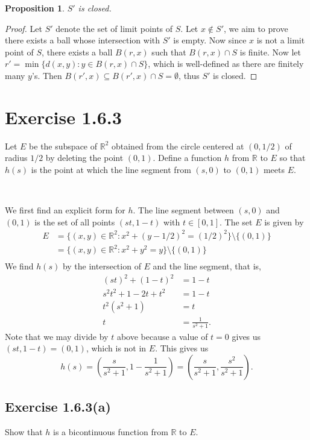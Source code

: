 \documentclass[12pt]{article}
\newcommand{\R}{\mathbb{R}}
\newenvironment{problem}
    {\begin{lrbox}{\mybox}\begin{minipage}{\textwidth-10pt}}
    {\end{minipage}\end{lrbox}\framebox[6.5in]{\usebox{\mybox}}\\}
\newtheorem{proposition}{Proposition}
\begin{document}
\newpage
\begin{proposition}
    $S'$ is closed.
\end{proposition}

\begin{proof}
     Let $S'$ denote the set of limit points of $S$. Let $x\notin S'$, we aim to prove there exists a ball whose intersection with $S'$ is empty. Now since $x$ is not a limit point of $S$, there exists a ball $B(r,x)$ such that $B(r,x)\cap S$ is finite. Now let $r'=\min\{d(x,y) : y\in B(r,x)\cap S\}$, which is well-defined as there are finitely many $y$'s. Then $B(r',x) \subseteq B(r',x)\cap S = \emptyset$, thus $S'$ is closed.
    
\end{proof}

\section*{Exercise 1.6.3}
\begin{problem}
    Let $E$ be the subspace of $\R^2$ obtained from the circle centered at $(0,1/2)$ of radius $1/2$ by deleting the point $(0,1)$. Define a function $h$ from $\R$ to $E$ so that $h(s)$ is the point at which the line segment from $(s,0)$ to $(0,1)$ meets $E$.
\end{problem}

We first find an explicit form for $h$. The line segment between $(s,0)$ and $(0,1)$ is the set of all points $(st,1-t)$ with $t\in[0,1]$. The set $E$ is given by
\begin{align*}
    E &= \{(x,y)\in\R^2 : x^2 + (y-1/2)^2 = (1/2)^2\}\setminus\{(0,1)\} \\
      &= \{(x,y)\in\R^2 : x^2 + y^2 = y\}\setminus\{(0,1)\} \\
\end{align*}
We find $h(s)$ by the intersection of $E$ and the line segment, that is,
\begin{align*}
    (st)^2 + (1-t)^2 &= 1-t\\
    s^2t^2 + 1 -2t + t^2 &= 1-t \\
    t^2(s^2+1) &= t \\
    t &= \frac1{s^2+1}.
\end{align*}
Note that we may divide by $t$ above because a value of $t=0$ gives us $(st,1-t)=(0,1)$, which is not in $E$. This gives us
\[h(s) = \left(\frac{s}{s^2+1}, 1 - \frac1{s^2+1}\right) = \left(\frac{s}{s^2+1}, \frac{s^2}{s^2+1}\right).\]

\subsection*{Exercise 1.6.3(a)}
\begin{problem}
    Show that $h$ is a bicontinuous function from $\R$ to $E$.
\end{problem}
\end{document}
